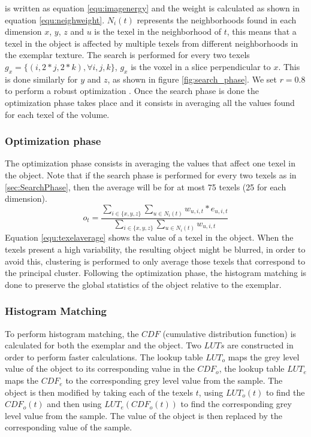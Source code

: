 \documentclass[10pt, conference]{IEEEtran}
\begin{document}
{is written as equation \ref{equ:imagenergy} and the weight is calculated
as shown in equation \ref{equ:neighweight}. $N_i(t)$ represents the neighborhoods found in each dimension $x$, $y$, $z$ 
and $u$ is the texel in the neighborhood of $t$, this means that
a texel in the object is affected by multiple texels from different neighborhoods in the exemplar texture. 
The search is performed for every two texels $g_x = \{(i, 2 * j, 2 * k), \forall i, j, k \} $, $g_x$ 
is the voxel in a slice perpendicular to $x$. This is done similarly for $y$ and $z$, as shown in figure \ref{fig:search_phase}.
We set $r = 0.8$ to perform a robust optimization \cite{kwatra:2005:SIGGRAPH}.
%
Once the search phase is done the optimization phase takes place and it consists in averaging 
all the values found for each texel of the volume. 

\subsubsection{Optimization phase}
\label{sec:OptimizationPhase}
%
The optimization phase consists in averaging the values that affect one texel in the object. Note that
if the search phase is performed for every two texels as in \ref{sec:SearchPhase}, 
then the average will be for at most 75 texels (25 for each dimension).
%
\begin{equation}
 o_t = \frac{ \sum_{i \in \{x, y, z\}} \sum_{u \in N_i(t)} w_{u, i, t} * e_{u, i, t} }{ \sum_{i \in \{x, y, z\}} \sum_{u \in N_i(t)} w_{u, i, t} }
 \label{equ:texelaverage}
\end{equation}
%
Equation \ref{equ:texelaverage} shows the value of a texel in the object. 
When the texels present a high variability, the resulting object might be
blurred, in order to avoid this, 
clustering is performed to only average those texels that correspond to the principal cluster.
%
Following the optimization phase, the histogram matching is done to preserve the 
global statistics of the object relative to the exemplar.  

\subsubsection{Histogram Matching}
\label{sec:histogramMatching}
%
To perform histogram matching, the $CDF$ (cumulative distribution function) is calculated for both the exemplar and the object. 
Two $LUTs$ are constructed in order to perform faster calculations. The lookup table $LUT_o$ maps the grey level value of the object
to its corresponding value in the $CDF_o$, the lookup table $LUT_e$ maps the $CDF_e$
to the corresponding grey level value from the sample. 
The object is then modified by taking each of the texels $t$, using $LUT_o(t)$ to find the $CDF_o(t)$
and then using $LUT_e(CDF_o(t))$ to find the corresponding grey level value from the sample. The value of the object is then replaced 
by the corresponding value of the sample.

}
\end{document}
